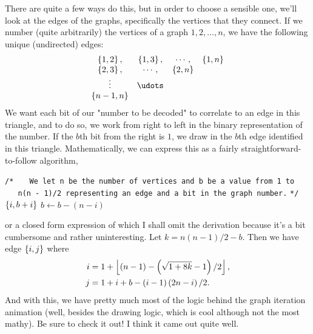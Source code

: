 There are quite a few ways do this, but in order to choose a sensible one,
we'll look at the edges of the graphs, specifically the vertices that they
connect. If we number (quite arbitrarily) the vertices of a graph \(
1,2,\ldots,n \), we have the following unique (undirected) edges:
\[
\begin{array}{cccc}
    \set{1, 2}, & \set{1, 3}, & \cdots, & \set{1, n} \\
    \set{2, 3}, & \cdots, & \set{2, n} & \\
    \vdots & \udots & \\
    \set{n - 1, n} & & &
\end{array}
\]
We want each bit of our "number to be decoded" to correlate to an edge in this
triangle, and to do so, we work from right to left in the binary representation
of the number. If the \( b \)th bit from the right is \( 1 \), we draw in the
\( b \)th edge identified in this triangle. Mathematically, we can express this as a fairly straightforward-to-follow algorithm,
\begin{blackbox}
    \begin{algorithmic}
        \State \texttt{/*}
        \State \texttt{\ \ \ We let n be the number of vertices and b be a value from 1 to}
        \State \texttt{\ \ \ n(n - 1)/2 representing an edge and a bit in the graph number.}
        \State \texttt{*/}
                    \State \Return \( \left\{ i, b + i \right\} \)
                \Else
                    \State \( b \gets b - \left( n - i \right) \)
                \EndIf
            \EndFor
        \EndFunction
    \end{algorithmic}
\end{blackbox}
or a closed form expression of which I shall omit the derivation
 because it's a bit cumbersome and rather uninteresting. Let \( k = n \left( n - 1 \right) / 2 - b \). Then we have edge \( \left\{ i, j \right\} \) where
\begin{align*}
    i &= 1 + \left\lfloor \left( n - 1 \right) - \left( \sqrt{1 + 8k} - 1 \right) / 2 \right\rfloor, \\
    j &= 1 + i + b - \left( i - 1 \right) \left( 2n - i \right) / 2
.\end{align*}
And with this, we have pretty much most of the logic behind the graph iteration
animation (well, besides the drawing logic, which is cool although not the most
mathy). Be sure to check it out! I think it came out quite well.
